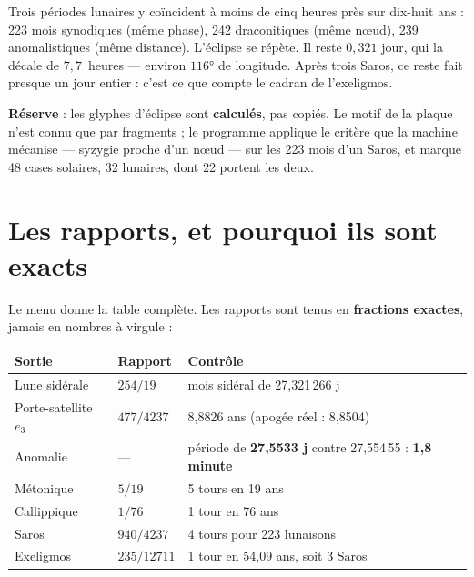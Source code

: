 \begin{info}
Trois périodes lunaires y coïncident à moins de cinq heures près sur dix-huit ans : 223 mois
synodiques (même phase), 242 draconitiques (même n\oe ud), 239 anomalistiques (même
distance). L'éclipse se répète. Il reste $0{,}321$ jour, qui la décale de $7{,}7$~heures —
environ $116°$ de longitude. Après trois Saros, ce reste fait presque un jour entier : c'est
ce que compte le cadran de l'exeligmos.

\textbf{Réserve} : les glyphes d'éclipse sont \textbf{calculés}, pas copiés. Le motif de la
plaque n'est connu que par fragments ; le programme applique le critère que la machine
mécanise — syzygie proche d'un n\oe ud — sur les 223 mois d'un Saros, et marque 48 cases
solaires, 32 lunaires, dont 22 portent les deux.
\end{info}

\section{Les rapports, et pourquoi ils sont exacts}

Le menu  donne la table complète. Les rapports
sont tenus en \textbf{fractions exactes}, jamais en nombres à virgule :

\begin{center}
\begin{tabularx}{\textwidth}{@{}llX@{}}
\toprule
\rowcolor{lightblue}\textbf{Sortie} & \textbf{Rapport} & \textbf{Contrôle} \\
\midrule
Lune sidérale & $254/19$ & mois sidéral de 27,321\,266 j \\
Porte-satellite $e_3$ & $477/4237$ & 8,8826 ans (apogée réel : 8,8504) \\
Anomalie & — & période de \textbf{27,5533 j} contre 27,554\,55 : \textbf{1,8 minute} \\
Métonique & $5/19$ & 5 tours en 19 ans \\
Callippique & $1/76$ & 1 tour en 76 ans \\
Saros & $940/4237$ & 4 tours pour 223 lunaisons \\
Exeligmos & $235/12711$ & 1 tour en 54,09 ans, soit 3 Saros \\
\bottomrule
\end{tabularx}
\end{center}

